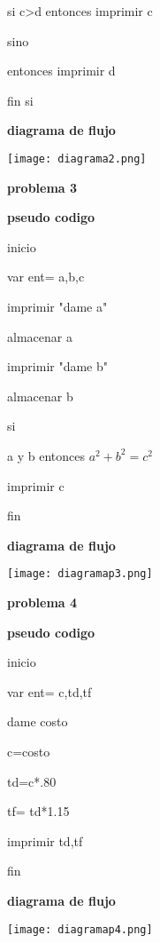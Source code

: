 \documentclass[11pt,a4paper]{article}
\begin{document}
\begin{multicols}{2}
si c>d entonces imprimir c

sino 

entonces imprimir d
 
fin si 
 

\textbf{diagrama de flujo}



\texttt{[image: diagrama2.png]} 








\begin{center}

\textbf{problema 3}
\end{center}
\textbf{pseudo codigo}

inicio

var ent= a,b,c

imprimir "dame a"

almacenar a

imprimir "dame b"

almacenar b

si

a y b entonces $a^2+b^2= c^2$

imprimir c

fin 

\textbf{diagrama de flujo}

 

\texttt{[image: diagramap3.png]} 







\begin{center}

\textbf{problema 4}
\end{center}
\textbf{pseudo codigo}


inicio

var ent= c,td,tf

 dame costo

 c=costo
 
 td=c*.80

 tf= td*1.15
 
 imprimir td,tf

  fin 




\textbf{diagrama de flujo}





\texttt{[image: diagramap4.png]} 
\end{multicols}
 
\end{document}
